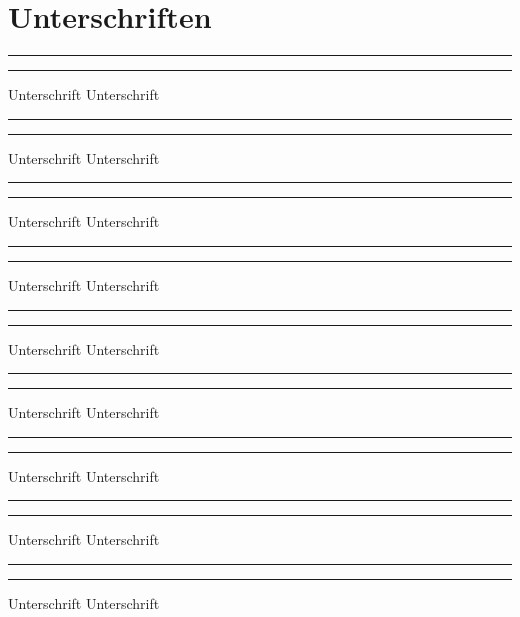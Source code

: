 \documentclass[fontsize=12pt,parskip=half]{scrartcl}
\begin{document}
\pagebreak
\section{Unterschriften}
\vspace{50pt}
\noindent\rule{7cm}{.4pt}\hfill\rule{7cm}{.4pt}\par
\noindent Unterschrift \hfill Unterschrift

\vspace{50pt}
\noindent\rule{7cm}{.4pt}\hfill\rule{7cm}{.4pt}\par
\noindent Unterschrift \hfill Unterschrift

\vspace{50pt}
\noindent\rule{7cm}{.4pt}\hfill\rule{7cm}{.4pt}\par
\noindent Unterschrift \hfill Unterschrift

\vspace{50pt}
\noindent\rule{7cm}{.4pt}\hfill\rule{7cm}{.4pt}\par
\noindent Unterschrift \hfill Unterschrift

\vspace{50pt}
\noindent\rule{7cm}{.4pt}\hfill\rule{7cm}{.4pt}\par
\noindent Unterschrift \hfill Unterschrift

\vspace{50pt}
\noindent\rule{7cm}{.4pt}\hfill\rule{7cm}{.4pt}\par
\noindent Unterschrift \hfill Unterschrift

\vspace{50pt}
\noindent\rule{7cm}{.4pt}\hfill\rule{7cm}{.4pt}\par
\noindent Unterschrift \hfill Unterschrift

\vspace{50pt}
\noindent\rule{7cm}{.4pt}\hfill\rule{7cm}{.4pt}\par
\noindent Unterschrift \hfill Unterschrift

\vspace{50pt}
\noindent\rule{7cm}{.4pt}\hfill\rule{7cm}{.4pt}\par
\noindent Unterschrift \hfill Unterschrift
\end{document}
